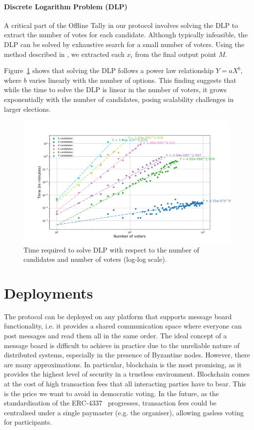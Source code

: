 \documentclass[runningheads]{llncs}
\begin{document}
\paragraph{Discrete Logarithm Problem (DLP)}

A critical part of the Offline Tally in our protocol involves solving the DLP to extract the number of votes for each candidate. Although typically infeasible, the DLP can be solved by exhaustive search for a small number of voters. Using the method described in \cite{haoAnonymousVotingTworound2010}, we extracted each $x_i$ from the final output point $M$. 

Figure~\ref{fig:dlog-search} shows that solving the DLP follows a power law relationship \( Y = aX^b \), where \( b \) varies linearly with the number of options. This finding suggests that while the time to solve the DLP is linear in the number of voters, it grows exponentially with the number of candidates, posing scalability challenges in larger elections.

\begin{figure}
    \centering
    \includegraphics[width=.9\textwidth]{dlog-search.png}
    \caption{Time required to solve DLP with respect to the number of candidates and number of voters (log-log scale).}
    \label{fig:dlog-search}
\end{figure}

\section{Deployments}\label{sec:deployments}
The protocol can be deployed on any platform that supports message board functionality, i.e. it provides a shared communication space where everyone can post messages and read them all in the same order.
The ideal concept of a message board is difficult to achieve in practice due to the unreliable nature of distributed systems, especially in the presence of Byzantine nodes. 
However, there are many approximations.
In particular, blockchain is the most promising, as it provides the highest level of security in a trustless environment. 
Blockchain comes at the cost of high transaction fees that all interacting parties have to bear. This is the price we want to avoid in democratic voting.
In the future, as the standardisation of the ERC-4337~\cite{ERC4337AccountAbstraction} progresses, transaction fees could be centralised under a single paymaster (e.g. the organiser), allowing gasless voting for participants.
\end{document}
